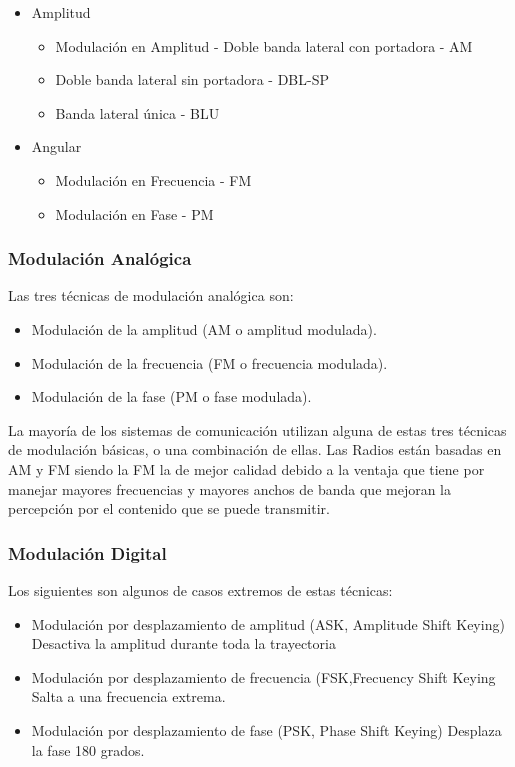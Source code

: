 \documentclass[a4paper]{article}
\begin{document}
\begin{itemize}
	\item Amplitud
	\begin{itemize}
		\item Modulación en Amplitud - Doble banda lateral con portadora - AM
		\item Doble banda lateral sin portadora - DBL-SP
		\item Banda lateral única - BLU
	\end{itemize}
	\item Angular
	\begin{itemize}
		\item Modulación en Frecuencia - FM
		\item Modulación en Fase - PM
	\end{itemize}
\end{itemize}

\subsubsection{Modulación Analógica}

Las tres técnicas de modulación analógica son:
\begin{itemize}
	\item Modulación de la amplitud (AM o amplitud modulada).
	\item Modulación de la frecuencia (FM o frecuencia modulada).
	\item Modulación de la fase (PM o fase modulada).
\end{itemize}


La mayoría de los sistemas de comunicación utilizan alguna de estas tres técnicas de modulación básicas, o una combinación de ellas. Las Radios están basadas en AM y FM siendo la FM la de mejor calidad debido a la ventaja que tiene por manejar mayores frecuencias y mayores anchos de banda que mejoran la percepción por el contenido que se puede transmitir.

\subsubsection{Modulación Digital}

Los siguientes son algunos de casos extremos de estas técnicas:

\begin{itemize}
		\item Modulación por desplazamiento de amplitud (ASK, Amplitude Shift Keying)
		Desactiva la amplitud durante toda la trayectoria
		
		\item Modulación por desplazamiento de frecuencia (FSK,Frecuency Shift Keying
		Salta a una frecuencia extrema.
		
		\item Modulación por desplazamiento de fase (PSK, Phase Shift Keying)
		Desplaza la fase 180 grados.
\end{itemize}
\end{document}
